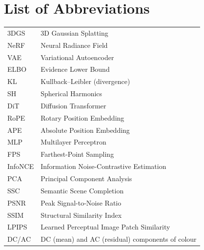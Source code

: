 \chapter{List of Abbreviations}

\begin{table}[h]
  \centering
  \begin{tabular}{ll}
    3DGS  & 3D Gaussian Splatting \\
    NeRF  & Neural Radiance Field \\
    VAE   & Variational Autoencoder \\
    ELBO  & Evidence Lower Bound \\
    KL    & Kullback--Leibler (divergence) \\
    SH    & Spherical Harmonics \\
    DiT   & Diffusion Transformer \\
    RoPE  & Rotary Position Embedding \\
    APE   & Absolute Position Embedding \\
    MLP   & Multilayer Perceptron \\
    FPS   & Farthest-Point Sampling \\
    InfoNCE & Information Noise-Contrastive Estimation \\
    PCA   & Principal Component Analysis \\
    SSC   & Semantic Scene Completion \\
    PSNR  & Peak Signal-to-Noise Ratio \\
    SSIM  & Structural Similarity Index \\
    LPIPS & Learned Perceptual Image Patch Similarity \\
    DC/AC & DC (mean) and AC (residual) components of colour \\
  \end{tabular}
\end{table}